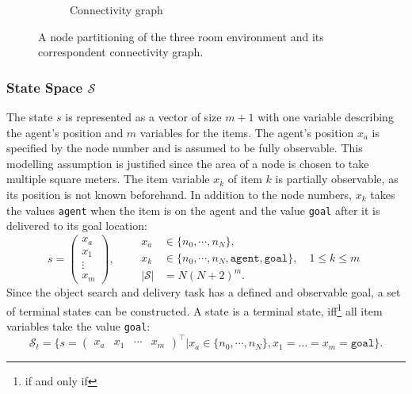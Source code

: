 \begin{figure}
\begin{subfigure}[b]{0.48\textwidth}
        \caption{Connectivity graph}
        \label{subfig:nodeconnection}
    \end{subfigure}
    \caption{A node partitioning of the three room environment and its correspondent connectivity graph.}
    \label{fig:nodes}
\end{figure}
\subsubsection{State Space $\mathcal{S}$}
The state $s$ is represented as a vector of size $m+1$ with one variable describing the agent's position and $m$ variables for the items. The agent's position $x_a$ is specified by the node number and is assumed to be fully observable. This modelling assumption is justified since the area of a node is chosen to take multiple square meters. The item variable $x_k$ of item $k$ is partially observable, as its position is not known beforehand. In addition to the node numbers, $x_k$ takes the values \texttt{agent} when the item is on the agent and the value \texttt{goal} after it is delivered to its goal location:
\begin{equation}
    s=\begin{pmatrix} x_a \\ x_1 \\ \vdots \\ x_m \end{pmatrix}, \qquad \begin{aligned} x_a&\in\{n_0, \cdots, n_N\},\\ 
    x_k &\in \{n_0, \cdots, n_N, \texttt{agent}, \texttt{goal}\}, \quad 1 \leq k \leq m \\
    |\mathcal{S}| &= N(N+2)^m. \end{aligned}
\end{equation}
Since the object search and delivery task has a defined and observable goal, a set of terminal states can be constructed. A state is a terminal state, iff\footnote{if and only if} all item variables take the value \texttt{goal}:
\begin{equation}\label{eq:s_t}
    \mathcal{S}_t = \{s=\begin{pmatrix} x_a & x_1 & \cdots & x_m \end{pmatrix}^\intercal | x_a\in \{n_0, \cdots, n_N\}, x_1=\ldots=x_m=\texttt{goal}\}.
\end{equation}
